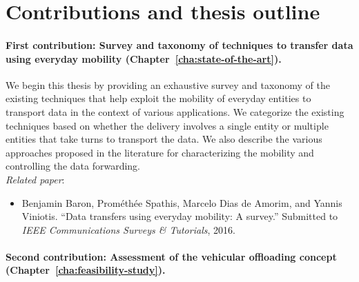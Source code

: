 \section{Contributions and thesis outline}

\paragraph{First contribution: Survey and taxonomy of techniques to transfer data using everyday mobility (Chapter~\ref{cha:state-of-the-art}).}

We begin this thesis by providing an exhaustive survey and taxonomy of the existing techniques that help exploit the mobility of everyday entities to transport data in the context of various applications. We categorize the existing techniques based on whether the delivery involves a single entity or multiple entities that take turns to transport the data. We also describe the various approaches proposed in the literature for characterizing the mobility and controlling the data forwarding.\\[3pt]
\textit{Related paper}:
\begin{itemize}
    \item Benjamin Baron, Prométhée Spathis, Marcelo Dias de Amorim, and Yannis Viniotis. ``Data transfers using everyday mobility: A survey.'' Submitted to \textit{IEEE Communications Surveys \& Tutorials}, 2016.
\end{itemize}


\paragraph{Second contribution: Assessment of the vehicular offloading concept (Chapter~\ref{cha:feasibility-study}).}


